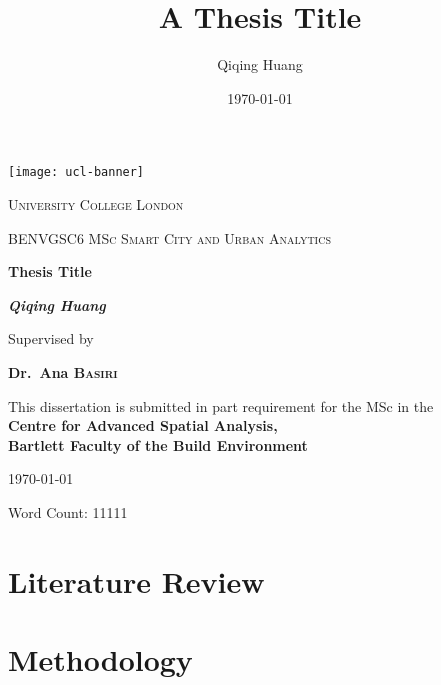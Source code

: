 \documentclass[11pt,a4paper ,oneside ,openany]{book}
\begin{document}
\title{A Thesis Title}
\author{Qiqing Huang}
\date{\today}
\begin{titlepage}
    \centering
    \vspace*{-3.5\baselineskip}
    \hspace*{-0.27\textwidth}
    \texttt{[image: ucl-banner]}
    \par\vspace*{5\baselineskip}
    {\scshape\LARGE University College London \par}
	\vspace{0.5cm}
	{\scshape\large BENVGSC6 MSc Smart City and Urban Analytics\par}
	\vspace{3cm}
	{\huge\bfseries Thesis Title\par}
	\vspace{3cm}
	{\Large\bfseries\itshape Qiqing Huang\par}
	\vspace{3cm}
	{Supervised by\par}
    {\bfseries Dr.~Ana \textsc{Basiri}\par}
    \vspace{0.5cm}
    {This dissertation is
    submitted in part requirement for the MSc 
    in the \\
    \bfseries{Centre for Advanced
    Spatial Analysis}, \\
    \bfseries{Bartlett Faculty of the
    Build Environment}\par}
	\vfill
    {\today\par}
    {Word Count: 11111\par}
\end{titlepage}

\frontmatter


\tableofcontents
\listoffigures
\listoftables


\mainmatter


\chapter{Literature Review}
\label{chapter2}


\chapter{Methodology}
\label{chapter3}

\end{document}
